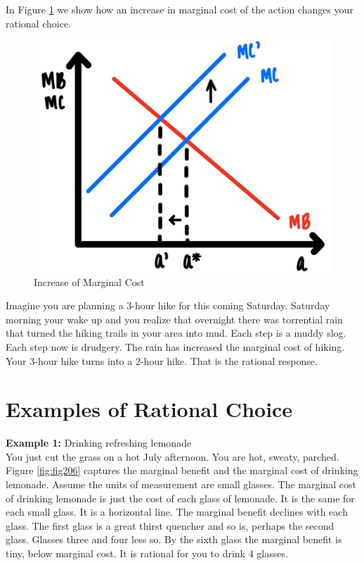 \documentclass[
]{book}
\begin{document}
In Figure \ref{fig:fig205} we show how an increase in marginal cost of the action changes your rational choice.

\begin{figure}

{\centering \includegraphics[width=0.75\linewidth]{img/ch2/fig5} 

}

\caption{Increase of Marginal Cost}\label{fig:fig205}
\end{figure}

Imagine you are planning a 3-hour hike for this coming Saturday. Saturday morning your wake up and you realize that overnight there was torrential rain that turned the hiking trails in your area into mud. Each step is a muddy slog. Each step now is drudgery. The rain has increased the marginal cost of hiking. Your 3-hour hike turns into a 2-hour hike. That is the rational response.

\hypertarget{examples-of-rational-choice}{%
\section{Examples of Rational Choice}\label{examples-of-rational-choice}}

\textbf{Example 1:} Drinking refreshing lemonade\\
You just cut the grass on a hot July afternoon. You are hot, sweaty, parched. Figure \ref{fig:fig206} captures the marginal benefit and the marginal cost of drinking lemonade. Assume the units of measurement are small glasses. The marginal cost of drinking lemonade is just the cost of each glass of lemonade. It is the same for each small glass. It is a horizontal line. The marginal benefit declines with each glass. The first glass is a great thirst quencher and so is, perhaps the second glass. Glasses three and four less so. By the sixth glass the marginal benefit is tiny, below marginal cost. It is rational for you to drink 4 glasses.
\end{document}
